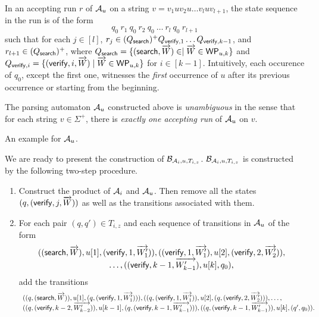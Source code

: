 In an accepting run $r$ of $\mathcal{A}_u$ on a string $v = v_1 u v_2 u \dots v_l u v_{l+1}$, the state sequence in the run is of the form 
$$q_0\ r_1\ q_0\ r_2\ q_0\ \dots\ r_l\ q_0\ r_{l+1}$$ 
such that  for each $j \in [l]$, $r_j \in (Q_{\mathsf{search}})^+ Q_{\mathsf{verify}, 1}  \dots  Q_{\mathsf{verify}, k-1}$, and $r_{l+1} \in (Q_{\mathsf{search}})^+$, where $Q_{\mathsf{search}}  = \{(\mathsf{search}, \overrightarrow{W}) \in \mid \overrightarrow{W} \in \mathsf{WP}_{u,k}\}$ and $Q_{\mathsf{verify}, i} = \{(\mathsf{verify}, i, \overrightarrow{W}) \mid \overrightarrow{W} \in \mathsf{WP}_{u,k}\}$ for $i \in [k-1]$. Intuitively, each occurence of $q_0$, except the first one, witnesses the \emph{first} occurrence of $u$ after its previous occurrence or starting from the beginning.

The parsing automaton $\mathcal{A}_u$ constructed above is \emph{unambiguous} in the sense that for each string $v \in \Sigma^+$, there is \emph{exactly one accepting run} of $\mathcal{A}_u$ on $v$.

\begin{example}
	An example for $\mathcal{A}_u$.
\end{example}

We are ready to present the construction of $\mathcal{B}_{\mathcal{A}_i, u,  T_{i, z}}$. $\mathcal{B}_{\mathcal{A}_i, u,  T_{i, z}}$ is constructed by the following two-step procedure.
\begin{enumerate}
\item Construct the product of $\mathcal{A}_i$ and $\mathcal{A}_u$. Then remove all the states $(q, (\mathsf{verify}, j, \overrightarrow{W}))$ as well as the transitions associated with them.

\item For each pair $(q,q') \in T_{i,z}$ and each sequence of transitions in $\mathcal{A}_u$ of the form  
$$
\begin{array}{l}
((\search, \overrightarrow{W}), u[1], (\verify, 1, \overrightarrow{W'_1})), ((\verify, 1, \overrightarrow{W'_1}), u[2], 
 (\verify, 2, \overrightarrow{W'_2})), \\
 \hspace{3cm} \dots, ((\verify, k-1, \overrightarrow{W'_{k-1}}), u[k], q_0),
\end{array}
$$ 
add the transitions 
$$
\begin{array}{l}
((q, (\mathsf{search}, \overrightarrow{W})), u[1], (q, (\mathsf{verify}, 1, \overrightarrow{W'_1}))), ((q, (\mathsf{verify}, 1, \overrightarrow{W'_1})), u[2], (q, (\mathsf{verify}, 2, \overrightarrow{W'_2}))), \dots,  \\
((q, (\mathsf{verify}, k-2, \overrightarrow{W'_{k-2}})), u[k-1], (q, (\mathsf{verify}, k-1, \overrightarrow{W'_{k-1}}))), ((q, (\mathsf{verify}, k-1, \overrightarrow{W'_{k-1}})), u[k], (q', q_0)).
\end{array}
$$
\end{enumerate}

